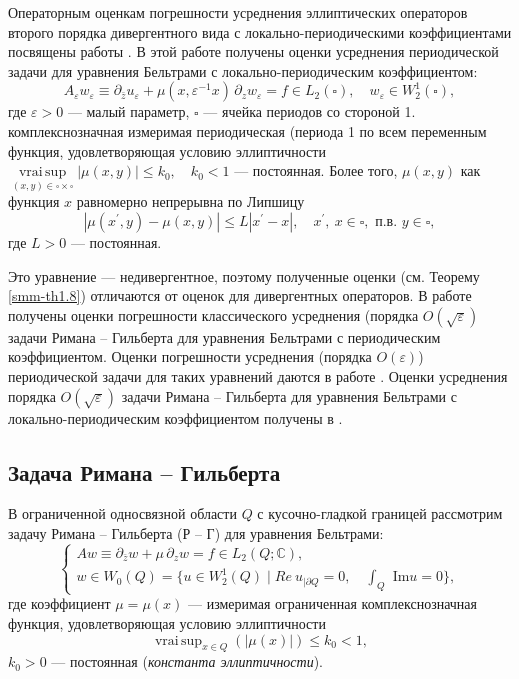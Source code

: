 \documentclass[a4paper,12pt]{article}
\theoremstyle{definition}
\begin{document}
Операторным оценкам погрешности усреднения  эллиптических операторов второго порядка дивергентного вида  с локально-периодическими коэффициентами посвящены работы \cite{smm-4,smm-5,smm-6,smm-7}.
В этой работе получены оценки усреднения периодической задачи  для уравнения Бельтрами с локально-периодическим коэффициентом:
$$
	A_\varepsilon w_\varepsilon\equiv\partial_{\bar{z}}u_\varepsilon+\mu(x,\varepsilon^{-1}x)\,\partial_z w_\varepsilon
=f\in L_2(\square),\quad w_\varepsilon\in W_2^1(\square),
$$
где $\varepsilon>0$ --- малый параметр, $\square$ --- ячейка периодов со стороной 1.
комплекснозначная измеримая периодическая (периода 1 по всем переменным   функция, удовлетворяющая условию эллиптичности
 $\mathop{vrai\, sup}\limits_{(x,y)\in\square\times\square}|\mu(x,y)|\leqslant k_0,\quad k_0<1$  --- постоянная.
 Более того, $\mu(x,y)$  как функция $x$ равномерно непрерывна по Липшицу
$$
|\mu(x^\prime,y)-\mu(x,y)|\leqslant L|x^\prime-x|,\quad x^\prime,\ x\in\square,  \text{ \ п.в.\ }   y\in\square,
$$
где $L>0$ --- постоянная.

Это уравнение --- недивергентное, поэтому полученные оценки (см. Теорему \ref{smm-th1.8}) отличаются от оценок для дивергентных операторов.
В работе \cite{smm-8} получены оценки погрешности классического усреднения (порядка  $O(\sqrt\varepsilon)$ задачи Римана -- Гильберта  для уравнения Бельтрами с периодическим коэффициентом. Оценки погрешности усреднения (порядка $O(\varepsilon)$) периодической задачи для таких уравнений даются в работе \cite{smm-9}.  Оценки усреднения  порядка $O(\sqrt\varepsilon)$  задачи Римана -- Гильберта для уравнения Бельтрами с локально-периодическим коэффициентом получены  в \cite{smm-10}.



 \subsection{Задача Римана -- Гильберта}
 В ограниченной односвязной области $Q$ с кусочно-гладкой границей рассмотрим задачу Римана -- Гильберта (Р -- Г) для уравнения Бельтрами:
\begin{equation}\label{smm-f:1.001}
	\left\{\begin{array}{l}
		A w\equiv\partial_{\bar{z}}w+\mu\,\partial_z w=f\in L_2(Q;\mathbb{C}), \\[3mm]
		w\in W_0(Q)=\{u\in W_2^1(Q) \mid { Re\ u}_{|\partial Q}=0,\quad \int_Q\text{ Im} u=0\},
	\end{array}\right.
\end{equation}
где коэффициент $\mu=\mu(x)$ --- измеримая ограниченная комплекснозначная функция, удовлетворяющая условию эллиптичности
\begin{equation}\label{smm-f:1.2}
	\mathop{vrai\,sup}_{x\in Q}\left(|\mu(x)|\right)\leqslant k_0 <1,
\end{equation}
$k_0>0$ --- постоянная (\textit{константа эллиптичности}).
\end{document}
